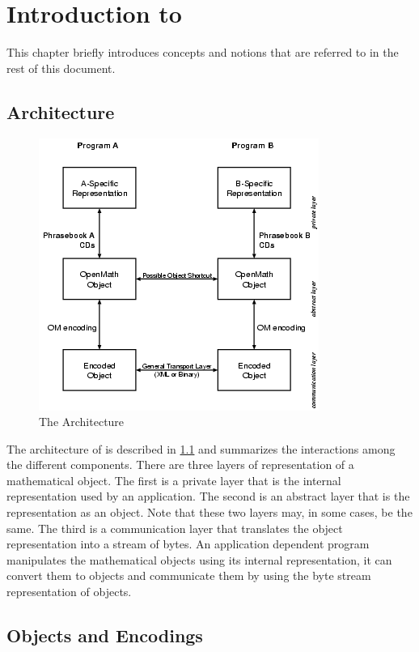 \chapter{Introduction to \OM}\label{cha_int}

This chapter briefly introduces \OM concepts and notions that are referred to in the rest
of this document.

\section{\OM Architecture}\label{sec_om-arch}

\begin{figure}\centering
  \includegraphics{om-arch}
  \caption{The \OM Architecture}\label{fig_om}
\end{figure}

The architecture of \OM is described in \ref{fig_om} and summarizes the interactions among
the different \OM components.  There are three layers of representation of a mathematical
object. The first is a private layer that is the internal representation used by an
application.  The second is an abstract layer that is the representation as an \OM object.
Note that these two layers may, in some cases, be the same.  The third is a communication
layer that translates the \OM object representation into a stream of bytes. An application
dependent program manipulates the mathematical objects using its internal representation,
it can convert them to \OM objects and communicate them by using the byte stream
representation of \OM objects.


\section{\OM Objects and Encodings}\label{sec_intro-obj}


